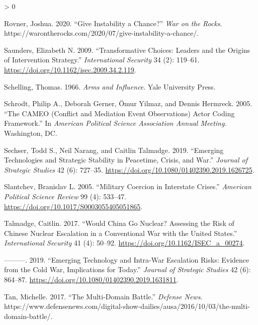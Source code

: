 \documentclass[
]{article}
\newlength{\cslhangindent}
\newenvironment{CSLReferences}[2] %
 {%
  \setlength{\parindent}{0pt}
  \ifodd #1 \everypar{\setlength{\hangindent}{\cslhangindent}}\ignorespaces\fi
  \ifnum #2 > 0
  \setlength{\parskip}{#2\baselineskip}
  \fi
 }%
 {}
\begin{document}
\begin{CSLReferences}{1}{0}
\leavevmode\hypertarget{ref-rovner_giveinstabilitychance_2020}{}%
Rovner, Joshua. 2020. {``Give {Instability} a {Chance}?''} \emph{War on the Rocks}. https://warontherocks.com/2020/07/give-instability-a-chance/.

\leavevmode\hypertarget{ref-saunders_transformativechoicesleaders_2009}{}%
Saunders, Elizabeth N. 2009. {``Transformative {Choices}: {Leaders} and the {Origins} of {Intervention Strategy}.''} \emph{International Security} 34 (2): 119--61. \url{https://doi.org/10.1162/isec.2009.34.2.119}.

\leavevmode\hypertarget{ref-schelling_armsinfluence_1966}{}%
Schelling, Thomas. 1966. \emph{Arms and {Influence}}. {Yale University Press}.

\leavevmode\hypertarget{ref-schrodt_cameoconflictmediation_2005}{}%
Schrodt, Philip A., Deborah Gerner, Ömur Yilmaz, and Dennis Hermreck. 2005. {``The {CAMEO} ({Conflict} and {Mediation Event Observations}) {Actor Coding Framework}.''} In \emph{American {Political Science Association Annual Meeting}}. {Washington, DC}.

\leavevmode\hypertarget{ref-sechser_emergingtechnologiesstrategic_2019}{}%
Sechser, Todd S., Neil Narang, and Caitlin Talmadge. 2019. {``Emerging Technologies and Strategic Stability in Peacetime, Crisis, and War.''} \emph{Journal of Strategic Studies} 42 (6): 727--35. \url{https://doi.org/10.1080/01402390.2019.1626725}.

\leavevmode\hypertarget{ref-slantchev_militarycoercioninterstate_2005}{}%
Slantchev, Branislav L. 2005. {``Military {Coercion} in {Interstate Crises}.''} \emph{American Political Science Review} 99 (4): 533--47. \url{https://doi.org/10.1017/S0003055405051865}.

\leavevmode\hypertarget{ref-talmadge_wouldchinago_2017}{}%
Talmadge, Caitlin. 2017. {``Would {China Go Nuclear}? {Assessing} the {Risk} of {Chinese Nuclear Escalation} in a {Conventional War} with the {United States}.''} \emph{International Security} 41 (4): 50--92. \url{https://doi.org/10.1162/ISEC_a_00274}.

\leavevmode\hypertarget{ref-talmadge_emergingtechnologyintrawar_2019}{}%
---------. 2019. {``Emerging Technology and Intra-War Escalation Risks: {Evidence} from the {Cold War}, Implications for Today.''} \emph{Journal of Strategic Studies} 42 (6): 864--87. \url{https://doi.org/10.1080/01402390.2019.1631811}.

\leavevmode\hypertarget{ref-tan_multidomainbattle_2017}{}%
Tan, Michelle. 2017. {``The {Multi-Domain Battle}.''} \emph{Defense News}. https://www.defensenews.com/digital-show-dailies/ausa/2016/10/03/the-multi-domain-battle/.


\end{CSLReferences}
\end{document}
